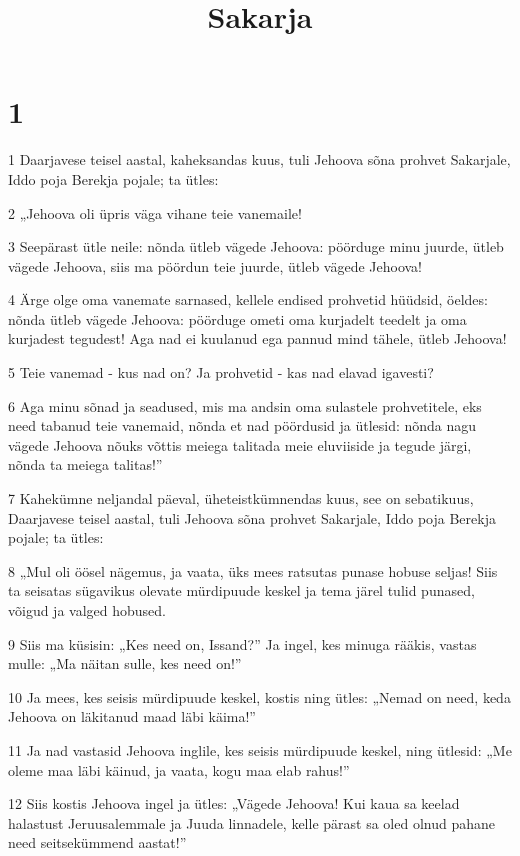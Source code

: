 

\title{Sakarja}

\chapter{1}

\par 1 Daarjavese teisel aastal, kaheksandas kuus, tuli Jehoova sõna prohvet Sakarjale, Iddo poja Berekja pojale; ta ütles:
\par 2 „Jehoova oli üpris väga vihane teie vanemaile!
\par 3 Seepärast ütle neile: nõnda ütleb vägede Jehoova: pöörduge minu juurde, ütleb vägede Jehoova, siis ma pöördun teie juurde, ütleb vägede Jehoova!
\par 4 Ärge olge oma vanemate sarnased, kellele endised prohvetid hüüdsid, öeldes: nõnda ütleb vägede Jehoova: pöörduge ometi oma kurjadelt teedelt ja oma kurjadest tegudest! Aga nad ei kuulanud ega pannud mind tähele, ütleb Jehoova!
\par 5 Teie vanemad - kus nad on? Ja prohvetid - kas nad elavad igavesti?
\par 6 Aga minu sõnad ja seadused, mis ma andsin oma sulastele prohvetitele, eks need tabanud teie vanemaid, nõnda et nad pöördusid ja ütlesid: nõnda nagu vägede Jehoova nõuks võttis meiega talitada meie eluviiside ja tegude järgi, nõnda ta meiega talitas!”
\par 7 Kahekümne neljandal päeval, üheteistkümnendas kuus, see on sebatikuus, Daarjavese teisel aastal, tuli Jehoova sõna prohvet Sakarjale, Iddo poja Berekja pojale; ta ütles:
\par 8 „Mul oli öösel nägemus, ja vaata, üks mees ratsutas punase hobuse seljas! Siis ta seisatas sügavikus olevate mürdipuude keskel ja tema järel tulid punased, võigud ja valged hobused.
\par 9 Siis ma küsisin: „Kes need on, Issand?” Ja ingel, kes minuga rääkis, vastas mulle: „Ma näitan sulle, kes need on!”
\par 10 Ja mees, kes seisis mürdipuude keskel, kostis ning ütles: „Nemad on need, keda Jehoova on läkitanud maad läbi käima!”
\par 11 Ja nad vastasid Jehoova inglile, kes seisis mürdipuude keskel, ning ütlesid: „Me oleme maa läbi käinud, ja vaata, kogu maa elab rahus!”
\par 12 Siis kostis Jehoova ingel ja ütles: „Vägede Jehoova! Kui kaua sa keelad halastust Jeruusalemmale ja Juuda linnadele, kelle pärast sa oled olnud pahane need seitsekümmend aastat!”
